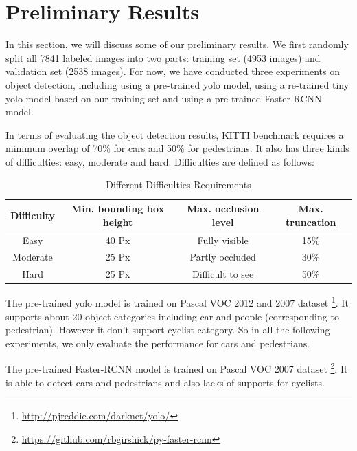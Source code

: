 \section{Preliminary Results}

In this section, we will discuss some of our preliminary results. 
We first randomly split all 7841 labeled images into two parts: 
training set (4953 images) and validation set (2538 images). 
For now, we have conducted three experiments on object detection, including using a pre-trained yolo model, using a re-trained tiny yolo model based on our training set and using a pre-trained Faster-RCNN model.

In terms of evaluating the object detection results, KITTI benchmark requires a minimum overlap of 70\% for cars and 50\% for pedestrians. It also has three kinds of difficulties: easy, moderate and hard. Difficulties are defined as follows:

\begin{table}[h!]
\centering
\begin{tabular}{ c | c | c | c }
\hline
Difficulty & Min. bounding box height & Max. occlusion level & Max. truncation \\
\hline \hline
Easy & 40 Px & Fully visible & 15\% \\
Moderate & 25 Px & Partly occluded & 30\% \\
Hard & 25 Px & Difficult to see & 50\% \\
\hline
\end{tabular}
\caption{Different Difficulties Requirements}
\end{table}

The pre-trained yolo model is trained on Pascal VOC 2012 and 2007 dataset \footnote{\url{http://pjreddie.com/darknet/yolo/}}. It supports about 20 object categories including car and people (corresponding to pedestrian). However it don't support cyclist category. So in all the following experiments, we only evaluate the performance for cars and pedestrians.


The pre-trained Faster-RCNN model is trained on Pascal VOC 2007 dataset \footnote{\url{https://github.com/rbgirshick/py-faster-rcnn}}. It is able to detect cars and pedestrians and also lacks of supports for cyclists.

